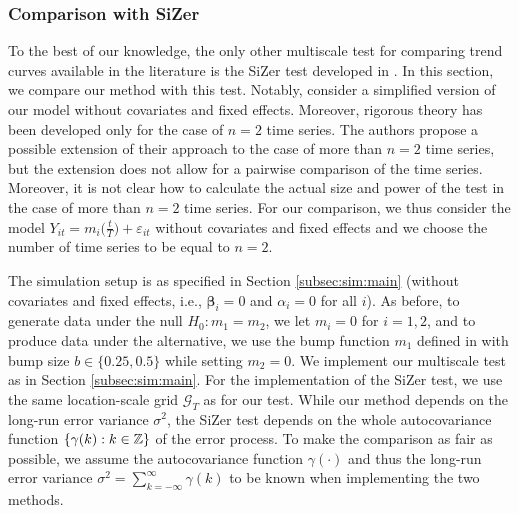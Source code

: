 \documentclass[12pt]{article}
\makeatletter
\renewcommand{\eqref}[1]{\tagform@{\ref{#1}}}
\makeatother
\begin{document}
\subsubsection{Comparison with SiZer} 


To the best of our knowledge, the only other multiscale test for comparing trend curves available in the literature is the SiZer test developed in \cite{Park2009}. In this section, we compare our method with this test. Notably, \cite{Park2009} consider a simplified version of our model without covariates and fixed effects. Moreover, rigorous theory has been developed only for the case of $n=2$ time series. The authors propose a possible extension of their approach to the case of more than $n=2$ time series, but the extension does not allow for a pairwise comparison of the time series. Moreover, it is not clear how to calculate the actual size and power of the test in the case of more than $n=2$ time series. For our comparison, we thus consider the model $Y_{it} = m_i\big(\frac{t}{T}\big) + \varepsilon_{it}$ without covariates and fixed effects and we choose the number of time series to be equal to $n=2$. 


The simulation setup is as specified in Section \ref{subsec:sim:main} (without covariates and fixed effects, i.e., $\boldsymbol{\beta}_i = 0$ and $\alpha_i = 0$ for all $i$).
As before, to generate data under the null $H_0: m_1 = m_2$, we let $m_i = 0$ for $i=1, 2$, and to produce data under the alternative, we use the bump function $m_1$ defined in \eqref{eq:bump-fct} with bump size $b \in \{ 0.25, 0.5 \}$ while setting $m_2 = 0$.
We implement our multiscale test as in Section \ref{subsec:sim:main}. For the implementation of the SiZer test, we use the same location-scale grid $\mathcal{G}_T$ as for our test. While our method depends on the long-run error variance $\sigma^2$, the SiZer test depends on the whole autocovariance function $\{ \gamma(k): k \in \mathbb{Z}\}$ of the error process. To make the comparison as fair as possible, we assume the autocovariance function $\gamma(\cdot)$ and thus the long-run error variance $\sigma^2 = \sum_{k=-\infty}^\infty \gamma(k)$ to be known when implementing the two methods.
\end{document}

